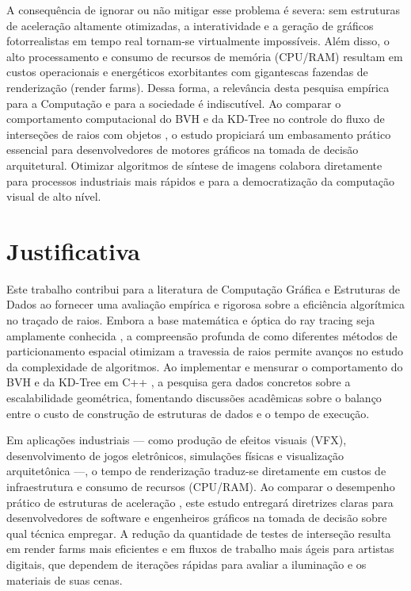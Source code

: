 \documentclass[
    12pt,                %
    openright,           %
    oneside,             %
    a4paper,             %
    english,             %
    brazil               %
]{abntex2}
\begin{document}
A consequência de ignorar ou não mitigar esse problema é severa: sem estruturas de aceleração altamente otimizadas, a interatividade e a geração de gráficos fotorrealistas em tempo real tornam-se virtualmente impossíveis. Além disso, o alto processamento e consumo de recursos de memória (CPU/RAM) resultam em custos operacionais e energéticos exorbitantes com gigantescas fazendas de renderização (render farms).
Dessa forma, a relevância desta pesquisa empírica para a Computação e para a sociedade é indiscutível. Ao comparar o comportamento computacional do BVH e da KD-Tree no controle do fluxo de interseções de raios com objetos , o estudo propiciará um embasamento prático essencial para desenvolvedores de motores gráficos na tomada de decisão arquitetural. Otimizar algoritmos de síntese de imagens colabora diretamente para processos industriais mais rápidos e para a democratização da computação visual de alto nível.


\section{Justificativa}
\label{sec:justificativa}

Este trabalho contribui para a literatura de Computação Gráfica e Estruturas de Dados ao fornecer uma avaliação empírica e rigorosa sobre a eficiência algorítmica no traçado de raios. Embora a base matemática e óptica do ray tracing seja amplamente conhecida , a compreensão profunda de como diferentes métodos de particionamento espacial otimizam a travessia de raios permite avanços no estudo da complexidade de algoritmos. Ao implementar e mensurar o comportamento do BVH e da KD-Tree em C++ , a pesquisa gera dados concretos sobre a escalabilidade geométrica, fomentando discussões acadêmicas sobre o balanço entre o custo de construção de estruturas de dados e o tempo de execução.


Em aplicações industriais — como produção de efeitos visuais (VFX), desenvolvimento de jogos eletrônicos, simulações físicas e visualização arquitetônica —, o tempo de renderização traduz-se diretamente em custos de infraestrutura e consumo de recursos (CPU/RAM). Ao comparar o desempenho prático de estruturas de aceleração , este estudo entregará diretrizes claras para desenvolvedores de software e engenheiros gráficos na tomada de decisão sobre qual técnica empregar. A redução da quantidade de testes de interseção  resulta em render farms mais eficientes e em fluxos de trabalho mais ágeis para artistas digitais, que dependem de iterações rápidas para avaliar a iluminação e os materiais de suas cenas.
\end{document}
